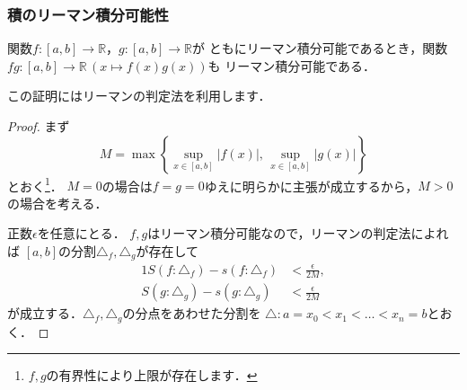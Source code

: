\documentclass[./index]{subfiles}
\begin{document}
\subsubsection{積のリーマン積分可能性}

\begin{screen}
    \begin{proposition}
        関数$f:[a,b] \rightarrow \mathbb{R}$，$g:[a,b] \rightarrow \mathbb{R}$が
        ともにリーマン積分可能であるとき，関数$fg:[a,b] \rightarrow \mathbb{R}\,(x \mapsto f(x)g(x))$も
        リーマン積分可能である．
    \end{proposition}
\end{screen}

この証明にはリーマンの判定法を利用します．

\begin{proof}
    まず
    \begin{equation}
        M = \max \left\{ \sup_{x \in [a,b]} |f(x)|,\, \sup_{x \in [a,b]} |g(x)| \right\}
    \end{equation}
    とおく\footnote{$f, g$の有界性により上限が存在します．}．
    $M = 0$の場合は$f = g = 0$ゆえに明らかに主張が成立するから，$M > 0$の場合を考える．

    正数$\epsilon$を任意にとる．
    $f, g$はリーマン積分可能なので，リーマンの判定法によれば
    $[a,b]$の分割$\triangle_f, \triangle_g$が存在して
    \begin{alignat}{1}
        S(f: \triangle_f) - s(f: \triangle_f) &< \frac{\epsilon}{2M}, \\
        S(g: \triangle_g) - s(g: \triangle_g) &< \frac{\epsilon}{2M}
    \end{alignat}
    が成立する．$\triangle_f, \triangle_g$の分点をあわせた分割を
    $\triangle: a = x_0 < x_1 < \dots < x_n = b$とおく．


\end{proof}
\end{document}
